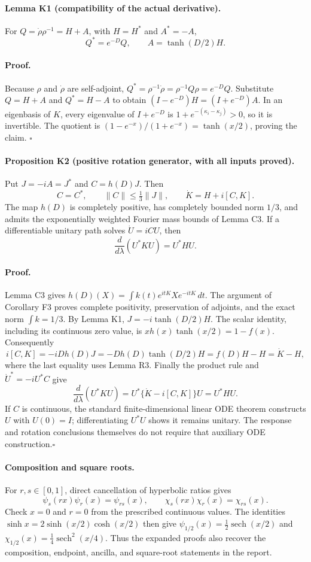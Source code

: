 \paragraph{Lemma K1 (compatibility of the actual derivative).}
For $Q=\dot\rho\rho^{-1}=H+A$, with $H=H^*$ and $A^*=-A$,
\[
 Q^*=e^{-D}Q,\qquad A=\tanh(D/2)H.
\]

\paragraph{Proof.}
Because $\rho$ and $\dot\rho$ are self-adjoint,
$Q^*=\rho^{-1}\dot\rho=\rho^{-1}Q\rho=e^{-D}Q$.
Substitute $Q=H+A$ and $Q^*=H-A$ to obtain
$(I-e^{-D})H=(I+e^{-D})A$.
In an eigenbasis of $K$, every eigenvalue of $I+e^{-D}$ is
$1+e^{-(\kappa_i-\kappa_j)}>0$, so it is invertible.
The quotient is $(1-e^{-x})/(1+e^{-x})=\tanh(x/2)$, proving the claim.
\hfill$\square$

\paragraph{Proposition K2 (positive rotation generator, with all inputs proved).}
Put $J=-iA=J^*$ and $C=h(D)J$. Then
\[
 C=C^*,\qquad \|C\|\leq\tfrac13\|J\|,
 \qquad \dot K=H+i[C,K].
\]
The map $h(D)$ is completely positive, has completely bounded norm
$1/3$, and admits the exponentially weighted Fourier mass bounds of
Lemma C3. If a differentiable unitary path solves $\dot U=iCU$, then
\[
 \frac d{d\lambda}(U^*KU)=U^*HU.
\]

\paragraph{Proof.}
Lemma C3 gives
$h(D)(X)=\int k(t)e^{itK}Xe^{-itK}\,dt$.
The argument of Corollary F3 proves complete positivity, preservation
of adjoints, and the exact norm $\int k=1/3$.
By Lemma K1, $J=-i\tanh(D/2)H$. The scalar identity, including its
continuous zero value, is
$xh(x)\tanh(x/2)=1-f(x)$.
Consequently
\[
 i[C,K]=-iD h(D)J
       =-D h(D)\tanh(D/2)H
       =f(D)H-H=\dot K-H,
\]
where the last equality uses Lemma R3. Finally the product rule and
$\dot U^*=-iU^*C$ give
\[
 \frac d{d\lambda}(U^*KU)
 =U^*\{\dot K-i[C,K]\}U=U^*HU.
\]
If $C$ is continuous, the standard finite-dimensional linear ODE theorem
constructs $U$ with $U(0)=I$; differentiating $U^*U$ shows it remains
unitary. The response and rotation conclusions themselves do not require
that auxiliary ODE construction.\hfill$\square$

\paragraph{Composition and square roots.}
For $r,s\in[0,1]$, direct cancellation of hyperbolic ratios gives
\[
 \psi_s(rx)\psi_r(x)=\psi_{rs}(x),\qquad
 \chi_s(rx)\chi_r(x)=\chi_{rs}(x).
\]
Check $x=0$ and $r=0$ from the prescribed continuous values.
The identities $\sinh x=2\sinh(x/2)\cosh(x/2)$ then give
$\psi_{1/2}(x)=\tfrac12\operatorname{sech}(x/2)$ and
$\chi_{1/2}(x)=\tfrac14\operatorname{sech}^2(x/4)$.
Thus the expanded proofs also recover the composition, endpoint,
ancilla, and square-root statements in the report.
